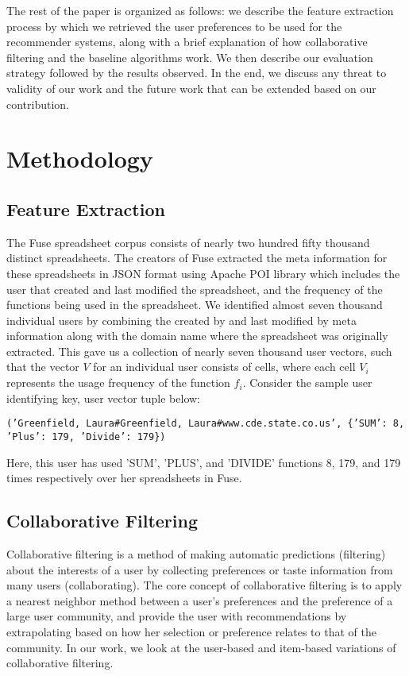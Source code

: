 \documentclass{article} %
\begin{document}
The rest of the paper is organized as follows: we describe the feature extraction process by which we retrieved the user preferences to be used for the recommender systems, along with a brief explanation of how collaborative filtering and the baseline algorithms work. We then describe our evaluation strategy followed by the results observed. In the end, we discuss any threat to validity of our work and the future work that can be extended based on our contribution.

\section{Methodology}
\subsection{Feature Extraction}
The Fuse spreadsheet corpus consists of nearly two hundred fifty thousand distinct spreadsheets. The creators of Fuse extracted the meta information for these spreadsheets in JSON format using Apache POI library which includes the user that created and last modified the spreadsheet, and the frequency of the functions being used in the spreadsheet. We identified almost seven thousand individual users by combining the created by and last modified by meta information along with the domain name where the spreadsheet was originally extracted. This gave us a collection of nearly seven thousand user vectors, such that the vector $V$ for an individual user consists of cells, where each cell $V_{i}$ represents the usage frequency of the function $f_{i}$. Consider the sample user identifying key, user vector tuple below:
\begin{center}
   \texttt{('Greenfield, Laura\#Greenfield, Laura\#www.cde.state.co.us', \{'SUM': 8, 'Plus': 179, 'Divide': 179\})}
\end{center}
Here, this user has used 'SUM', 'PLUS', and 'DIVIDE' functions 8, 179, and 179 times respectively over her spreadsheets in Fuse.

\subsection{Collaborative Filtering}
Collaborative filtering is a method of making automatic predictions (filtering) about the interests of a user by collecting preferences or taste information from many users (collaborating). The core concept of collaborative filtering is to apply a nearest neighbor method between a user's preferences and the preference of a large user community, and provide the user with recommendations by extrapolating based on how her selection or preference relates to that of the community. In our work, we look at the user-based and item-based variations of collaborative filtering.
\end{document}
